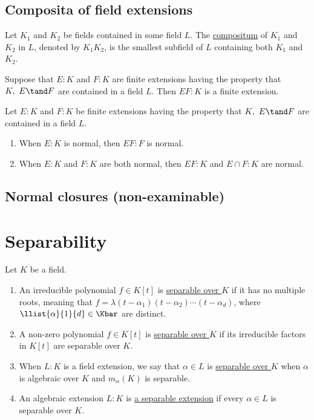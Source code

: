 \documentclass{article}
\begin{document}
\subsection{Composita of field extensions}
  \begin{tdefinition}[Compositum]
    Let \( K_1 \) and \( K_2 \) be fields contained in some field \( L \).
    The \ul{compositum} of \( K_1 \) and \( K_2 \) in \( L \), denoted by \( K_1K_2 \), is the smallest subfield of \( L \) containing both \( K_1 \) and \( K_2 \).
  \end{tdefinition}

  \begin{tproposition}
    Suppose that \( E:K \) and \( F:K \) are finite extensions having the property that \( K,\ E\tand F \) are contained in a field \( L \).
    Then \( EF:K \) is a finite extension.
  \end{tproposition}

  \begin{ttheorem}
    Let \( E:K \) and \( F:K \) be finite extensions having the property that \( K,\ E\tand F \) are contained in a field \( L \).
    \begin{enumerate}[label=(\alph*)]
      \item When \( E:K \) is normal, then \( EF:F \) is normal.
      \item When \( E:K \) and \( F:K \) are both normal, then \( EF:K \) and \( E\cap F:K \) are normal.
    \end{enumerate}
  \end{ttheorem}

\subsection{Normal closures (non-examinable)}

\section{Separability} %
\setcounter{tdefinition}{24}
  \begin{tdefinition}[Separable]
    Let \( K \) be a field.
    \begin{enumerate}[label=(\roman*)]
      \item An irreducible polynomial \( f\in K[t] \) is \ul{separable over \( K \)} if it has no multiple roots, meaning that \( f=\lambda(t-\alpha_1)(t-\alpha_2)\cdots(t-\alpha_d) \), where \( \llist{\alpha}{1}{d}\in \Kbar \) are distinct.
      \item A non-zero polynomial \( f\in K[t] \) is \ul{separable over \( K \)} if its irreducible factors in \( K[t] \) are separable over \( K \).
      \item When \( L:K \) is a field extension, we say that \( \alpha \in L \) is \ul{separable over \( K \)} when \( \alpha \) is algebraic over \( K \) and \( m_\alpha(K) \) is separable.
      \item An algebraic extension \( L:K \) is \ul{a separable extension} if every \( \alpha\in L \) is separable over \( K \).
    \end{enumerate}
  \end{tdefinition}
\end{document}
